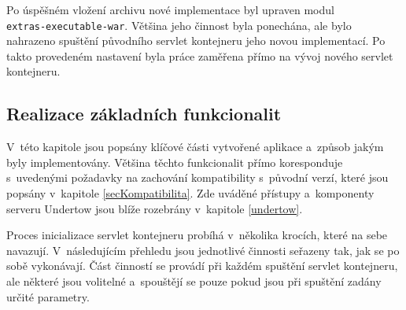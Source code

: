             Po úspěšném vložení archivu nové implementace byl upraven modul \\\texttt{extras-executable-war}.
            Většina jeho činnost byla ponechána, ale bylo nahrazeno spuštění původního servlet kontejneru
            jeho novou implementací. Po takto provedeném nastavení byla práce zaměřena přímo na vývoj
            nového servlet kontejneru. 

        


        \subsection{Realizace základních funkcionalit}
            V~této kapitole jsou popsány klíčové části vytvořené aplikace a~způsob jakým byly implementovány. Většina těchto
            funkcionalit přímo koresponduje s~uvedenými požadavky na zachování kompatibility s~původní verzí, 
            které jsou popsány v~kapitole \ref{secKompatibilita}.
            Zde uváděné přístupy a~komponenty serveru Undertow jsou blíže rozebrány v~kapitole \ref{undertow}.

            Proces inicializace servlet kontejneru probíhá v~několika krocích, které na sebe
            navazují. V~následujícím přehledu jsou jednotlivé činnosti seřazeny tak, jak
            se po sobě vykonávají. 
            Část činností se provádí při každém spuštění servlet kontejneru,
            ale některé jsou volitelné a~spouštějí se pouze pokud jsou při spuštění
            zadány určité parametry. 

